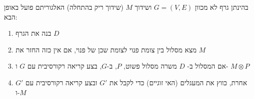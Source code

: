 בהינתן גרף לא מכוון 
$G = (V, E)$
ושידוך
$M$
(שידוך ריק בהתחלה) האלגוריתם פועל באופן הבא:
\begin{enumerate}
\item
בנה את הגרף 
$D$
\item
מצא מסלול בין צומת פנוי לצומת שכן של פנוי, אם אין כזה החזר את $M$
\item
אם המסלול ב-%
$D$
משרה מסלול פשוט, $P$, ב-$G$, בצע קריאה רקורסיבית עם $G$ ו-%
$M \otimes P$
\item
אחרת, כווץ את המעגלים (האי זוגיים) כדי לקבל את 
$G'$
ובצע קריאה רקורסיבית עם 
$G'$
ו-$M$
\end{enumerate}
